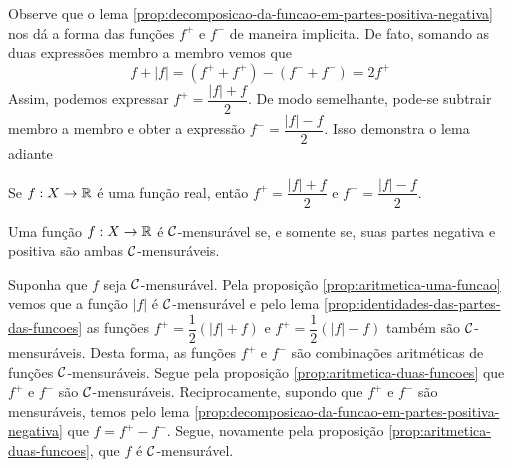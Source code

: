     Observe que o lema \ref{prop:decomposicao-da-funcao-em-partes-positiva-negativa} nos dá a forma das funções $f^+$ e $f^-$ de maneira implicita.
    De fato, somando as duas expressões membro a membro vemos que 
    $$f + |f| = (f^+ + f^+) - (f^- + f^-) = 2f^+$$
    Assim, podemos expressar $f^+ = \dfrac{|f| + f}{2}$.
    De modo semelhante, pode-se subtrair membro a membro e obter a expressão $f^- = \dfrac{|f| - f}{2}$. 
    Isso demonstra o lema adiante

    \begin{lemma}
    \label{prop:identidades-das-partes-das-funcoes}
        Se $f: X \to \mathbb{R}$ é uma função real, então $f^+ = \dfrac{|f| + f}{2}$ e $f^- = \dfrac{|f| - f}{2}$.
    \end{lemma}
	
    \begin{theorem}
        Uma função $f: X \to \mathbb{R}$ é $\operatorname{\mathcal{C}}$-mensurável se, e somente se, suas partes negativa e positiva são ambas $\operatorname{\mathcal{C}}$-mensuráveis. 
    \end{theorem}

    \begin{prova}
        Suponha que $f$ seja $\operatorname{\mathcal{C}}$-mensurável.
        Pela proposição \ref{prop:aritmetica-uma-funcao} vemos que a função $|f|$ é $\operatorname{\mathcal{C}}$-mensurável e pelo lema \ref{prop:identidades-das-partes-das-funcoes} as funções $f^+ = \dfrac{1}{2}(|f| + f)$ e $f^+ = \dfrac{1}{2}(|f| - f)$ também são $\operatorname{\mathcal{C}}$-mensuráveis.
        Desta forma, as funções $f^+$ e $f^-$ são combinações aritméticas de funções $\operatorname{\mathcal{C}}$-mensuráveis.
        Segue pela proposição \ref{prop:aritmetica-duas-funcoes} que $f^+$ e $f^-$ são $\operatorname{\mathcal{C}}$-mensuráveis.
        Reciprocamente, supondo que $f^+$ e $f^-$ são mensuráveis, temos pelo lema \ref{prop:decomposicao-da-funcao-em-partes-positiva-negativa} que
        $f = f^+ - f^-$. Segue, novamente pela proposição \ref{prop:aritmetica-duas-funcoes}, que $f$ é $\operatorname{\mathcal{C}}$-mensurável. 
    \end{prova}


                            
